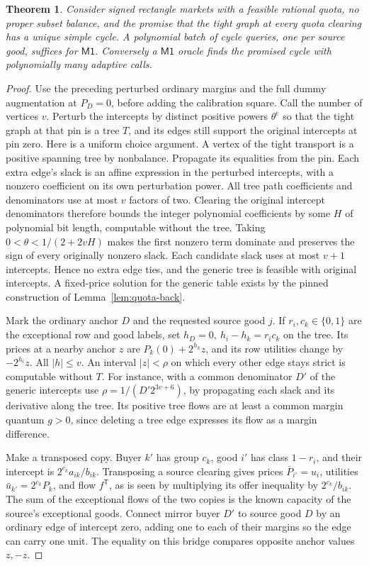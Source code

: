 \documentclass[11pt,oneside,openany,notitlepage]{report}
\newtheorem{theorem}{Theorem}[chapter]
\newcommand{\Market}{\mathsf{M1}}
\begin{document}
\begin{theorem}\label{thm:distcycle}
Consider signed rectangle markets with a feasible rational quota, no
proper subset balance, and the promise that the tight graph at every
quota clearing has a unique simple cycle. A polynomial batch of cycle
queries, one per source good, suffices for \(\Market\). Conversely a
\(\Market\) oracle finds the promised cycle with polynomially many
adaptive calls.
\end{theorem}
\begin{proof}
Use the preceding perturbed ordinary margins and the full dummy
augmentation at \(P_D=0\), before adding the calibration square. Call
the number of vertices \(v\). Perturb the intercepts by distinct
positive powers \(\theta^e\) so that the tight graph at that pin is a
tree \(T\), and its edges still support the original intercepts at pin
zero. Here is a uniform choice argument. A vertex of the tight transport
is a positive spanning tree by nonbalance. Propagate its equalities
from the pin. Each extra edge's slack is an affine expression in the
perturbed intercepts, with a nonzero coefficient on its own perturbation
power. All tree path coefficients and denominators use at most \(v\)
factors of two. Clearing the original intercept denominators therefore
bounds the integer polynomial coefficients by some \(H\) of polynomial
bit length, computable without the tree. Taking \(0<\theta<1/(2+2vH)\)
makes the first nonzero term dominate and preserves the sign of every
originally nonzero slack. Each candidate slack uses at most \(v+1\)
intercepts. Hence no extra edge ties, and the generic tree is feasible
with original intercepts. A fixed-price solution for the generic table
exists by the pinned construction of Lemma~\ref{lem:quota-back}.

Mark the ordinary anchor \(D\) and the requested source good \(j\).
If \(r_i,c_k\in\{0,1\}\) are the exceptional row and good labels, set
\(h_D=0,\ h_i-h_k=r_ic_k\) on the tree. Its prices at a nearby anchor
\(z\) are \(P_k(0)+2^{h_k}z\), and its row utilities change by
\(-2^{h_i}z\). All \(|h|\le v\). An interval \(|z|<\rho\) on which
every other edge stays strict is computable without \(T\). For instance,
with a common denominator \(D'\) of the generic intercepts use
\(\rho=1/(D'2^{3v+6})\), by propagating each slack and its derivative
along the tree. Its positive tree flows are at least a common margin
quantum \(g>0\), since deleting a tree edge expresses its flow as a
margin difference.

Make a transposed copy. Buyer \(k'\) has group \(c_k\), good \(i'\)
has class \(1-r_i\), and their intercept is
\(2^{c_k}a_{ik}/b_{ik}\). Transposing a source clearing gives prices
\(\bar P_{i'}=u_i\), utilities \(\bar u_{k'}=2^{c_k}P_k\), and flow
\(f^{\mathsf T}\), as is seen by multiplying its offer inequality by
\(2^{c_k}/b_{ik}\). The sum of the exceptional flows of the two copies
is the known capacity of the source's exceptional goods. Connect mirror
buyer \(D'\) to source good \(D\) by an ordinary edge of intercept zero,
adding one to each of their margins so the edge can carry one unit.
The equality on this bridge compares opposite anchor values \(z,-z\).


\end{proof}
\end{document}
